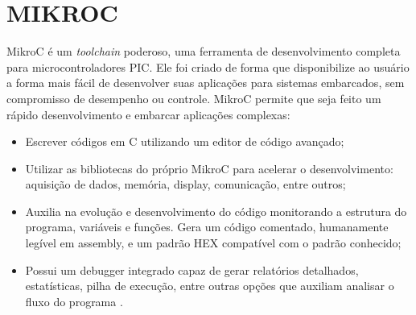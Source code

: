 \chapter{MIKROC}
MikroC é um \emph{toolchain} poderoso, uma ferramenta de desenvolvimento completa para microcontroladores PIC. Ele foi criado de forma que disponibilize ao usuário a forma mais fácil de desenvolver suas aplicações para sistemas embarcados, sem compromisso de desempenho ou controle. MikroC permite que seja feito um rápido desenvolvimento e embarcar aplicações complexas:

\begin{itemize}
\item Escrever códigos em C utilizando um editor de código avançado;
\item Utilizar as bibliotecas do próprio MikroC para acelerar o desenvolvimento: aquisição de dados, memória, display, comunicação, entre outros;
\item Auxilia na evolução e desenvolvimento do código monitorando a estrutura do programa, variáveis e funções. Gera um código comentado, humanamente legível em assembly, e um padrão HEX compatível com o padrão conhecido;
\item Possui um debugger integrado capaz de gerar relatórios detalhados, estatísticas, pilha de execução, entre outras opções que auxiliam analisar o fluxo do programa \cite{mikroc2006}.
\end{itemize}